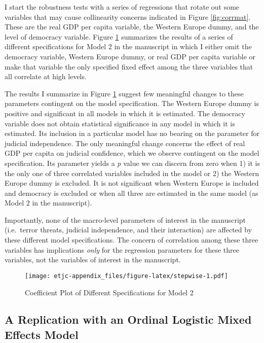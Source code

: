 \documentclass[11pt,]{article}
\makeatletter
\def\maxwidth{\ifdim\Gin@nat@width>\linewidth\linewidth
\else\Gin@nat@width\fi}
\let\Oldincludegraphics\includegraphics
\renewcommand{\includegraphics}[1]{\Oldincludegraphics[width=\maxwidth]{#1}}
\makeatother
\begin{document}
I start the robustness tests with a series of regressions that rotate
out some variables that may cause collinearity concerns indicated in
Figure \ref{fig:corrmat}. These are the real GDP per capita variable,
the Western Europe dummy, and the level of democracy variable. Figure
\ref{fig:coefstep} summarizes the results of a series of different
specifications for Model 2 in the manuscript in which I either omit the
democracy variable, Western Europe dummy, or real GDP per capita
variable or make that variable the only specified fixed effect among the
three variables that all correlate at high levels.

The results I summarize in Figure \ref{fig:coefstep} suggest few
meaningful changes to these parameters contingent on the model
specification. The Western Europe dummy is positive and significant in
all models in which it is estimated. The democracy variable does not
obtain statistical significance in any model in which it is estimated.
Its inclusion in a particular model has no bearing on the parameter for
judicial independence. The only meaningful change concerns the effect of
real GDP per capita on judicial confidence, which we observe contingent
on the model specification. Its parameter yields a \emph{p} value we can
discern from zero when 1) it is the only one of three correlated
variables included in the model or 2) the Western Europe dummy is
excluded. It is not significant when Western Europe is included and
democracy is excluded or when all three are estimated in the same model
(as Model 2 in the manuscript).

Importantly, none of the macro-level parameters of interest in the
manuscript (i.e.~terror threats, judicial independence, and their
interaction) are affected by these different model specifications. The
concern of correlation among these three variables has implications
\emph{only} for the regression parameters for these three variables, not
the variables of interest in the manuscript.

\begin{figure}[htbp]
\centering
\texttt{[image: etjc-appendix\_files/figure-latex/stepwise-1.pdf]}
\caption{\label{fig:coefstep} Coefficient Plot of Different
Specifications for Model 2}
\end{figure}

\subsection{A Replication with an Ordinal Logistic Mixed Effects
Model}\label{a-replication-with-an-ordinal-logistic-mixed-effects-model}
\end{document}
